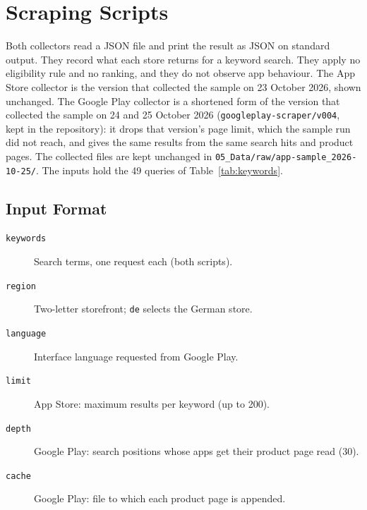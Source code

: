 \chapter{Scraping Scripts}
\label{app:scripts}
Both collectors read a JSON file and print the result as JSON on standard
output. They record what each store returns for a keyword search. They apply no
eligibility rule and no ranking, and they do not observe app behaviour. The App
Store collector is the version that collected the sample on 23 October 2026,
shown unchanged. The Google Play collector is a shortened form of the version
that collected the sample on 24 and 25 October 2026
(\texttt{googleplay-scraper/v004}, kept in the repository): it drops that
version's page limit, which the sample run did not reach, and gives the same
results from the same search hits and product pages. The collected files are
kept unchanged in \texttt{05\_Data/raw/app-sample\_2026-10-25/}. The inputs
hold the 49 queries of Table~\ref{tab:keywords}.

\section{Input Format}
\begin{description}
  \item[\texttt{keywords}] Search terms, one request each (both scripts).
  \item[\texttt{region}] Two-letter storefront; \texttt{de} selects the German store.
  \item[\texttt{language}] Interface language requested from Google Play.
  \item[\texttt{limit}] App Store: maximum results per keyword (up to 200).
  \item[\texttt{depth}] Google Play: search positions whose apps get their
    product page read (30).
  \item[\texttt{cache}] Google Play: file to which each product page is appended.
\end{description}

\par\medskip\noindent
\begin{minipage}{\linewidth}

\end{minipage}
\par\medskip

